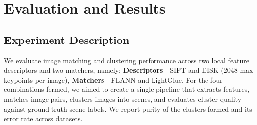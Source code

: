 \documentclass[report.tex]{subfiles}
\begin{document}
\chapter{Evaluation and Results}

\section{Experiment Description}

We evaluate image matching and clustering performance across two local feature descriptors and two matchers, namely: \textbf{Descriptors} - SIFT and DISK (\(2048\) max keypoints per image), \textbf{Matchers} - FLANN and LightGlue. For the four combinations formed, we aimed to create a single pipeline that extracts features, matches image pairs, clusters images into scenes, and evaluates cluster quality against ground-truth scene labels. We report purity of the clusters formed and its error rate across datasets.

\end{document}
